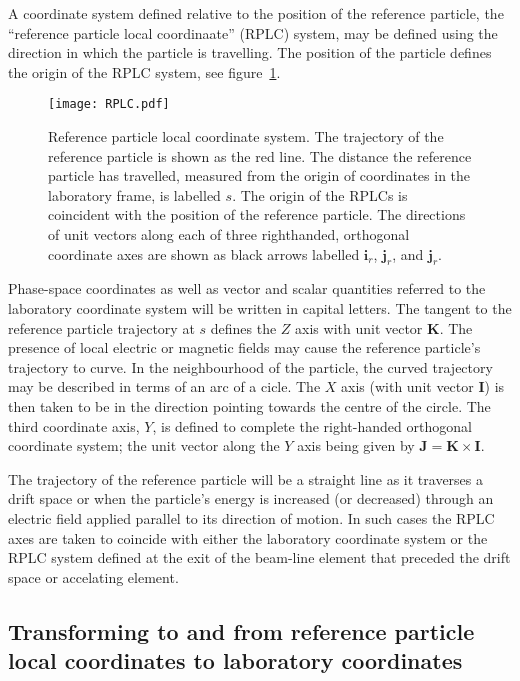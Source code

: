 A coordinate system defined relative to the position of the reference
particle, the ``reference particle local coordinaate'' (RPLC) system,
may be defined using the direction in which the particle is
travelling. 
The position of the particle defines the origin of the RPLC system,
see figure~\ref{fig:RPLC}.
\begin{figure}
  \begin{center}
    \texttt{[image: RPLC.pdf]}
  \end{center}
  \caption{
    Reference particle local coordinate system.
    The trajectory of the reference particle is shown as the red line.
    The distance the reference particle has travelled, measured from
    the origin of coordinates in the laboratory frame, is labelled
    $s$.
    The origin of the RPLCs is coincident with the position of the
    reference particle.
    The directions of unit vectors along each of three righthanded,
    orthogonal coordinate axes are shown as black arrows labelled
    $\bm{i}_r$, $\bm{j}_r$, and $\bm{j}_r$. 
  }
  \label{fig:RPLC}
\end{figure}

Phase-space coordinates as well as vector and scalar quantities
referred to the laboratory coordinate system will be written in
capital letters.
The tangent to the reference particle trajectory at $s$ defines the
$Z$ axis with unit vector $\bm{K}$.
The presence of local electric or magnetic fields may cause the
reference particle's trajectory to curve.
In the neighbourhood of the particle, the curved trajectory may be
described in terms of an arc of a cicle.
The $X$ axis (with unit vector $\bm{I}$) is then taken to be in
the direction pointing towards the centre of the circle.
The third coordinate axis, $Y$, is defined to complete the
right-handed orthogonal coordinate system; the unit vector along the
$Y$ axis being given by $\bm{J} = \bm{K} \times \bm{I}$.

The trajectory of the reference particle will be a straight line as it
traverses a drift space or when the particle's energy is increased (or
decreased) through an electric field applied parallel to its direction
of motion.
In such cases the RPLC axes are taken to coincide with either the
laboratory coordinate system or the RPLC system defined at the exit of
the beam-line element that preceded the drift space or accelating
element.

\subsection{Transforming to and from reference particle local
            coordinates to laboratory coordinates}
            
